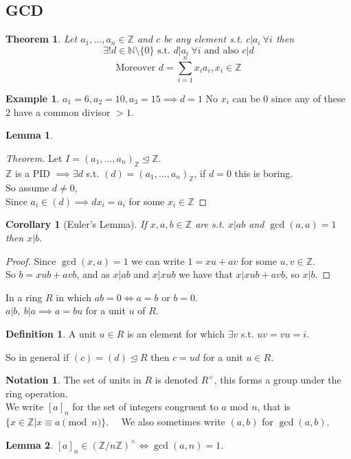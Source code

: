\documentclass{article}
\newtheorem*{thm}{Theorem}
\newtheorem*{lem}{Lemma}
\newtheorem*{cor}{Corollary}
\theoremstyle{definition}
\newtheorem*{defn}{Definition}
\newtheorem*{ex}{Example}
\newtheorem*{nota}{Notation}
\newcommand{\ZZ}{\mathbb{Z}}
\newcommand{\NN}{\mathbb{N}}
\begin{document}
\subsection{GCD}
\begin{thm}
Let $a_1,...,a_n \in \ZZ$ and $c$ be any element s.t. $c|a_i\ \forall i$ then
$$\exists! d \in \NN\setminus\{0\} \text{ s.t. } d|a_i\ \forall i \text{ and also } c|d$$
$$\text{Moreover }d = \sum_{i=1}^n x_i a_i, x_i \in\ZZ$$
\end{thm}
\begin{ex}
$a_1=6,a_2=10,a_3=15 \implies d=1$ No $x_i$ can be 0 since any of these 2 have a common divisor $> 1$.
\end{ex}
\begin{lem}

\end{lem}
\begin{proof}[Theorem]
Let $I=(a_1,...,a_n)_{\ZZ} \trianglelefteq \ZZ$. \\
$\ZZ$ is a PID $\implies \exists d $ s.t. $(d)=(a_1,...,a_n)_{\ZZ}$, if $d=0$ this is boring.\\
So assume $d\neq 0$,\\
Since $a_i \in(d) \implies dx_i = a_i$ for some $x_i \in \ZZ$
\end{proof}
\begin{cor}[Euler's Lemma]
If $x,a,b \in\ZZ$ are s.t. $x|ab$ and $\gcd(a,a)=1$ then $x|b$.
\end{cor}
\begin{proof}
Since $\gcd(x,a)=1$ we can write $1=xu+av$ for some $u,v\in\ZZ$.\\
So $b=xub+avb$, and as $x|ab$ and $x|xub$ we have that $x|xub+avb$, so $x|b$.
\end{proof}
In a ring $R$ in which $ab=0 \iff a=b$ or $b=0$. \\
$a|b,\ b|a \implies a=bu$ for a unit $u$ of $R$.
\begin{defn}
A unit $u\in R$ is an element for which $\exists v$ s.t. $uv=vu=i$.
\end{defn}
So in general if $(c)=(d) \trianglelefteq R$ then $c=ud$ for a unit $u\in R$.
\begin{nota}
The set of units in $R$ is denoted $R^\times$, this forms a group under the ring operation. \\
We write $[a]_n$ for the set of integers congruent to $a$ mod $n$, that is $\{x \in\ZZ | x \equiv a \pmod{n}\}$. \ \
We also sometimes write $(a,b)$ for $\gcd(a,b)$.
\end{nota}
\begin{lem}
$[a]_n\in (\ZZ /n\ZZ)^\times \iff \gcd(a,n)=1$.
\end{lem}
\end{document}
